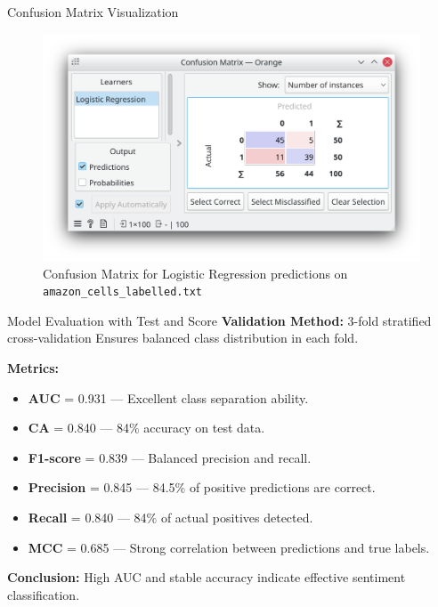 \documentclass[aspectratio=169, table]{beamer}
\begin{document}
\begin{frame}{Confusion Matrix Visualization}
	\vspace{20pt}
	\begin{figure}
		\centering
		\includegraphics[width=0.6\linewidth]{../../figures/sentiment_confusion_matrix.png}
		\caption{Confusion Matrix for Logistic Regression predictions on \texttt{amazon\_cells\_labelled.txt}}
		\label{fig:sentiment-confmatrix}
	\end{figure}
\end{frame}

\begin{frame}{Model Evaluation with Test and Score}
	\vspace{20pt}
	\textbf{Validation Method:} 3-fold stratified cross-validation  
	Ensures balanced class distribution in each fold.
	
	\vspace{0.5em}
	\textbf{Metrics:}
	\begin{itemize}
		\item \textbf{AUC} = 0.931 — Excellent class separation ability.
		\item \textbf{CA} = 0.840 — 84\% accuracy on test data.
		\item \textbf{F1-score} = 0.839 — Balanced precision and recall.
		\item \textbf{Precision} = 0.845 — 84.5\% of positive predictions are correct.
		\item \textbf{Recall} = 0.840 — 84\% of actual positives detected.
		\item \textbf{MCC} = 0.685 — Strong correlation between predictions and true labels.
	\end{itemize}
	
	\vspace{0.5em}
	\textbf{Conclusion:} High AUC and stable accuracy indicate effective sentiment classification.
\end{frame}
\end{document}
